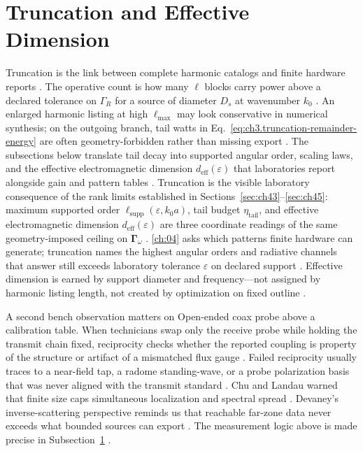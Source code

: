 \section{Truncation and Effective Dimension}
\label{sec:ch46}
Truncation is the link between complete harmonic catalogs and finite hardware reports \cite{hansen1988}. The operative count is how many $\ell$ blocks carry power above a declared tolerance on $\Gamma_R$ for a source of diameter $D_s$ at wavenumber $k_0$ \cite{chu1948}. An enlarged harmonic listing at high $\ell_{\max}$ may look conservative in numerical synthesis; on the outgoing branch, tail watts in Eq.~\eqref{eq:ch3.truncation-remainder-energy} are often geometry-forbidden rather than missing export \cite{stratton1941}. The subsections below translate tail decay into supported angular order, scaling laws, and the effective electromagnetic dimension $d_{\mathrm{eff}}(\varepsilon)$ that laboratories report alongside gain and pattern tables \cite{harrington2001}.
Truncation is the visible laboratory consequence of the rank limits established in Sections~\ref{sec:ch43}--\ref{sec:ch45}: maximum supported order $\ell_{\mathrm{supp}}(\varepsilon,k_0 a)$, tail budget $\eta_{\mathrm{tail}}$, and effective electromagnetic dimension $d_{\mathrm{eff}}(\varepsilon)$ are three coordinate readings of the same geometry-imposed ceiling on $\boldsymbol{\Gamma}_\omega$ \cite{chu1948}. \ref{ch:04} asks which patterns finite hardware can generate; truncation names the highest angular orders and radiative channels that answer still exceeds laboratory tolerance $\varepsilon$ on declared support \cite{devaney2004}. Effective dimension is earned by support diameter and frequency---not assigned by harmonic listing length, not created by optimization on fixed outline \cite{stratton1941}.
\begin{physicalvignette}
A second bench observation matters on Open-ended coax probe above a calibration table. When technicians swap only the receive probe while holding the transmit chain fixed, reciprocity checks whether the reported coupling is property of the structure or artifact of a mismatched flux gauge \cite{stratton1941}. Failed reciprocity usually traces to a near-field tap, a radome standing-wave, or a probe polarization basis that was never aligned with the transmit standard \cite{hansen1988}.
Chu and Landau warned that finite size caps simultaneous localization and spectral spread \cite{chu1948}. Devaney's inverse-scattering perspective reminds us that reachable far-zone data never exceeds what bounded sources can export \cite{devaney2004}.
The measurement logic above is made precise in Subsection~\ref{sec:ch46} \cite{stratton1941}.
\end{physicalvignette}
